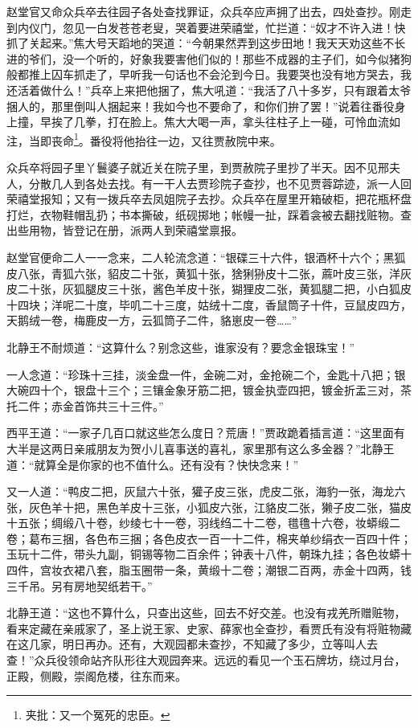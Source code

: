 \documentclass[12pt,oneside]{book}
\begin{document}
赵堂官又命众兵卒去往园子各处查找罪证，众兵卒应声拥了出去，四处查抄。刚走到内仪门，忽见一白发苍苍老叟，哭着要进荣禧堂，忙拦道：“奴才不许入进！快抓了关起来。”焦大号天蹈地的哭道：“今朝果然弄到这步田地！我天天劝这些不长进的爷们，没一个听的，好象我要害他们似的！那些不成器的主子们，如今似猪狗般都推上囚车抓走了，早听我一句话也不会沦到今日。我要哭也没有地方哭去，我还活着做什么！”兵卒上来把他捆了，焦大吼道：“我活了八十多岁，只有跟着太爷捆人的，那里倒叫人捆起来！我如今也不要命了，和你们拚了罢！”说着往番役身上撞，早挨了几拳，打在脸上。焦大大喝一声，拿头往柱子上一碰，可怜血流如注，当即丧命\footnote{夹批：又一个冤死的忠臣。}。番役将他抬往一边，又往贾赦院中来。

众兵卒将园子里丫鬟婆子就近关在院子里，到贾赦院子里抄了半天。因不见邢夫人，分散几人到各处去找。有一干人去贾珍院子查抄，也不见贾蓉踪迹，派一人回荣禧堂报知；又有一拨兵卒去凤姐院子去抄。众兵卒在屋里开箱破柜，把花瓶杯盘打烂，衣物鞋帽乱扔；书本撕破，纸砚掷地；帐幔一扯，踩着衾被去翻找赃物。查出些用物，皆登记在册，派两人到荣禧堂禀报。

赵堂官便命二人一一念来，二人轮流念道：“银碟三十六件，银酒杯十六个；黑狐皮八张，青狐六张，貂皮二十张，黄狐十张，猞猁狲皮十二张，蔴叶皮三张，洋灰皮二十张，灰狐腿皮三十张，酱色羊皮十张，猢狸皮二张，黄狐腿二把，小白狐皮十四块；洋呢二十度，毕叽二十三度，姑绒十二度，香鼠筒子十件，豆鼠皮四方，天鹅绒一卷，梅鹿皮一方，云狐筒子二件，貉崽皮一卷……”

北静王不耐烦道：“这算什么？别念这些，谁家没有？要念金银珠宝！”

一人念道：“珍珠十三挂，淡金盘一件，金碗二对，金抢碗二个，金匙十八把；银大碗四十个，银盘十三个；三镶金象牙筋二把，镀金执壶四把，镀金折盂三对，茶托二件；赤金首饰共三十三件。”

西平王道：“一家子几百口就这些怎么度日？荒唐！”贾政跪着插言道：“这里面有大半是这两日亲戚朋友为贺小儿喜事送的喜礼，家里那有这么多金器？”北静王道：“就算全是你家的也不值什么。还有没有？快快念来！”

又一人道：“鸭皮二把，灰鼠六十张，獾子皮三张，虎皮二张，海豹一张，海龙六张，灰色羊十把，黑色羊皮十三张，小狐皮六张，江貉皮二张，獭子皮二张，猫皮十五张；绸缎八十卷，纱绫七十一卷，羽线绉二十二卷，氆氇十六卷，妆蟒缎二卷；葛布三捆，各色布三捆；各色皮衣一百一十二件，棉夹单纱绢衣一百四十件；玉玩十二件，带头九副，铜锡等物二百余件；钟表十八件，朝珠九挂；各色妆蟒十四件，宫妆衣裙八套，脂玉圈带一条，黄缎十二卷；潮银二百两，赤金十四两，钱三千吊。另有房地契纸若干。”

北静王道：“这也不算什么，只查出这些，回去不好交差。也没有戎羌所赠赃物，看来定藏在亲戚家了，圣上说王家、史家、薛家也全查抄，看贾氏有没有将赃物藏在这几家，明日再办。还有，大观园都未查抄，不知藏了多少，立等叫人去查！”众兵役领命站齐队形往大观园奔来。远远的看见一个玉石牌坊，绕过月台，正殿，侧殿，崇阁危楼，往东而来。
\end{document}
